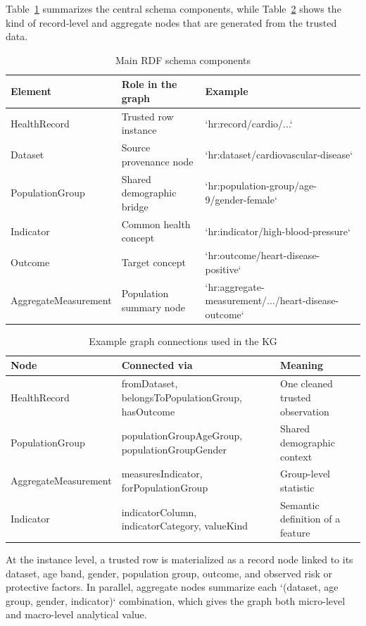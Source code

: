 \documentclass[11pt,a4paper]{article}
\begin{document}
Table~\ref{tab:kg-schema} summarizes the central schema components, while Table~\ref{tab:kg-example} shows the kind of record-level and aggregate nodes that are generated from the trusted data.

\begin{table}[ht]
\centering
\begin{tabular}{|l|l|l|}
\hline
\textbf{Element} & \textbf{Role in the graph} & \textbf{Example} \\ \hline
HealthRecord & Trusted row instance & `hr:record/cardio/...` \\ \hline
Dataset & Source provenance node & `hr:dataset/cardiovascular-disease` \\ \hline
PopulationGroup & Shared demographic bridge & `hr:population-group/age-9/gender-female` \\ \hline
Indicator & Common health concept & `hr:indicator/high-blood-pressure` \\ \hline
Outcome & Target concept & `hr:outcome/heart-disease-positive` \\ \hline
AggregateMeasurement & Population summary node & `hr:aggregate-measurement/.../heart-disease-outcome` \\ \hline
\end{tabular}
\caption{Main RDF schema components}
\label{tab:kg-schema}
\end{table}

\begin{table}[ht]
\centering
\begin{tabular}{|l|l|l|}
\hline
\textbf{Node} & \textbf{Connected via} & \textbf{Meaning} \\ \hline
HealthRecord & fromDataset, belongsToPopulationGroup, hasOutcome & One cleaned trusted observation \\ \hline
PopulationGroup & populationGroupAgeGroup, populationGroupGender & Shared demographic context \\ \hline
AggregateMeasurement & measuresIndicator, forPopulationGroup & Group-level statistic \\ \hline
Indicator & indicatorColumn, indicatorCategory, valueKind & Semantic definition of a feature \\ \hline
\end{tabular}
\caption{Example graph connections used in the KG}
\label{tab:kg-example}
\end{table}

At the instance level, a trusted row is materialized as a record node linked to its dataset, age band, gender, population group, outcome, and observed risk or protective factors. In parallel, aggregate nodes summarize each `(dataset, age group, gender, indicator)` combination, which gives the graph both micro-level and macro-level analytical value.
\end{document}
